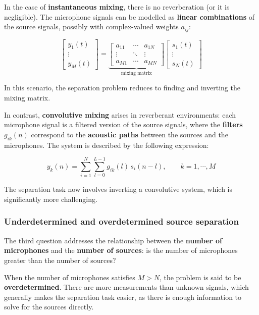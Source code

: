 In the case of \textbf{instantaneous mixing}, there is no reverberation (or it is negligible).  
The microphone signals can be modelled as \textbf{linear combinations} of the source signals, possibly with complex-valued weights $a_{ij}$:

\[
\begin{bmatrix}
y_{1}(t) \\
\vdots \\
y_{M}(t)
\end{bmatrix}
=
\underbrace{
\begin{bmatrix}
a_{11} & \cdots & a_{1N} \\
\vdots & \ddots & \vdots \\
a_{M1} & \cdots & a_{MN}
\end{bmatrix}
}_{\text{mixing matrix}}
\begin{bmatrix}
s_{1}(t) \\
\vdots \\
s_{N}(t)
\end{bmatrix}
\]

In this scenario, the separation problem reduces to finding and inverting the mixing matrix.

In contrast, \textbf{convolutive mixing} arises in reverberant environments: each microphone signal is a filtered version of the source signals, where the \textbf{filters} $g_{ik}(n)$ correspond to the \textbf{acoustic paths} between the sources and the microphones.  
The system is described by the following expression:

\[
y_{k}(n) =
\sum_{i=1}^{N} \sum_{l=0}^{L-1} g_{ik}(l) \, s_{i}(n - l), 
\qquad k = 1, \cdots, M
\]

The separation task now involves inverting a convolutive system, which is significantly more challenging.

\subsubsection{Underdetermined and overdetermined source separation}
The third question addresses the relationship between the \textbf{number of microphones} and the \textbf{number of sources}: is the number of microphones greater than the number of sources?

When the number of microphones satisfies $ M > N $, the problem is said to be \textbf{overdetermined}.
There are more measurements than unknown signals, which generally makes the separation task easier, as there is enough information to solve for the sources directly.


